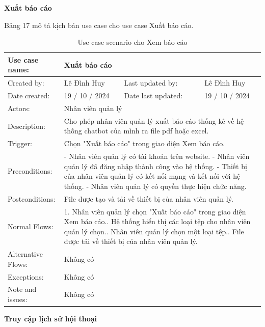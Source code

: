 \textbf{Xuất báo cáo}

Bảng 17 mô tả kịch bản use case cho use case Xuất báo cáo.

\begin{table}[H]
    \centering
    \begin{tabular}{|l|l|l|l|} 
        \hline
        Use case name: & \multicolumn{3}{|l|}{Xuất báo cáo} \\
        \hline
        Created by: & Lê Đình Huy & Last updated by: & Lê Đình Huy \\
        \hline
        Date created: & 19 / 10 / 2024 & Date last updated: & 19 / 10 / 2024 \\
        \hline
        Actors: & \multicolumn{3}{|l|}{Nhân viên quản lý} \\
        \hline
        Description: & \multicolumn{3}{|p{12cm}|}{Cho phép nhân viên quản lý xuất báo cáo thống kê về hệ thống chatbot của mình ra file pdf hoặc excel.} \\ 
        \hline
        Trigger: & \multicolumn{3}{|p{12cm}|}{Chọn "Xuất báo cáo" trong giao diện Xem báo cáo.} \\
        \hline
        Preconditions: & \multicolumn{3}{|p{12cm}|}{- Nhân viên quản lý có tài khoản trên website. \newline
        - Nhân viên quản lý đã đăng nhập thành công vào hệ thống. \newline
        - Thiết bị của nhân viên quản lý có kết nối mạng và kết nối với hệ thống. \newline
        - Nhân viên quản lý có quyền thực hiện chức năng.} \\
        \hline
        Postconditions: & \multicolumn{3}{|p{12cm}|}{File được tạo và tải về thiết bị của nhân viên quản lý.} \\
        \hline
        Normal Flows: & \multicolumn{3}{|p{12cm}|}{1. Nhân viên quản lý chọn "Xuất báo cáo" trong giao diện Xem báo cáo.\newline
        2. Hệ thống hiển thị các loại tệp cho nhân viên quản lý chọn.\newline
        3. Nhân viên quản lý chọn một loại tệp.\newline
        4. File được tải về thiết bị của nhân viên quản lý.}\\
        \hline
        Alternative Flows: & \multicolumn{3}{|p{12cm}|}{Không có} \\
        \hline
        Exceptions: & \multicolumn{3}{|p{12cm}|}{
        Không có} \\
        \hline
        Note and issues: & \multicolumn{3}{|p{12cm}|}{Không có} \\
        \hline
    \end{tabular}
    \caption{Use case scenario cho Xem báo cáo}
\end{table}
\textbf{Truy cập lịch sử hội thoại}

